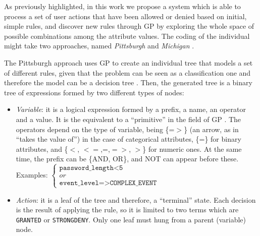 \documentclass[runningheads]{llncs}
\begin{document}
\label{subsec:solution}

As previously highlighted, in this work we propose a system which is
able to process a set of user actions that have been allowed or denied
based on initial, simple rules, and discover new rules through GP by exploring
the whole space of possible combinations among the attribute
values. The coding of the individual might take two approaches, named \textit{Pittsburgh} and \textit{Michigan}
\cite{freitas2002data}.

The Pittsburgh approach uses GP to create an individual tree that
models a set of different rules, given that the problem can be seen as
a 
classification one and therefore the model can be a decision tree
\cite{safavian1990survey}. Then, the generated tree is a binary tree
of expressions formed by two different types of nodes:

\begin{itemize}
\item {\em Variable}: it is a logical expression formed by a prefix, a
  name, an operator and a value. It is the equivalent to a
  ``primitive'' in the field of GP \cite{back1996evolutionary}. The
  operators depend on the type of variable, being \{=$>$\} (an arrow, as in ``takes the value of'') in the
  case of categorical attributes, \{=\} for binary attributes, and \{$<$, $<=$,=,$=>$,
  $>$\} for numeric ones. At the same time, the prefix can be \{AND,
  OR\}, and NOT can appear before these. \\ %
    Examples:
   \begin{math}
     \left \{
   \begin{array}{l}
     \texttt{password\_length<5} \\
     or \\
      \texttt{event\_level=>COMPLEX\_EVENT}
   \end{array}
   \right .
   \end{math}
\item {\em Action}: it is a leaf of the tree and therefore, a ``terminal'' state. Each decision is the result of applying the rule, so it is limited to two terms which are \texttt{GRANTED} or \texttt{STRONGDENY}. Only one leaf must hung from a parent (variable) node.
\end{itemize}
\end{document}
